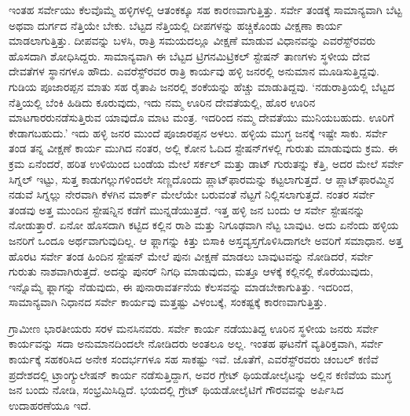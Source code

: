 ಇಂತಹ ಸರ್ವೇಯು ಕೆಲವೊಮ್ಮೆ ಹಳ್ಳಿಗಳಲ್ಲಿ ಆತಂಕಕ್ಕೂ ಸಹ ಕಾರಣವಾಗುತ್ತಿತ್ತು. ಸರ್ವೇ ತಂಡಕ್ಕೆ ಸಾಮಾನ್ಯವಾಗಿ ಬೆಟ್ಟ ಅಥವಾ ದುರ್ಗದ ನೆತ್ತಿಯೇ ಬೇಕು. ಬೆಟ್ಟದ ನೆತ್ತಿಯಲ್ಲಿ ದೀಪಗಳನ್ನು ಹಚ್ಚಿಕೊಂಡು ವೀಕ್ಷಣಾ ಕಾರ್ಯ ಮಾಡಲಾಗುತ್ತಿತ್ತು. ದೀಪವನ್ನು ಬಳಸಿ, ರಾತ್ರಿ ಸಮಯದಲ್ಲೂ ವೀಕ್ಷಣೆ ಮಾಡುವ ವಿಧಾನವನ್ನು ಎವರೆಸ್ಟ್​ರವರು ಹೊಸದಾಗಿ ಶೋಧಿಸಿದ್ದರು. ಸಾಮಾನ್ಯವಾಗಿ ಈ ಬೆಟ್ಟದ ಟ್ರಿಗನಮಿಟ್ರಿಕಲ್​ ಸ್ಟೇಷನ್​ ತಾಣಗಳು ಸ್ಥಳೀಯ ದೇವ ದೇವತೆಗಳ ಸ್ಥಾನಗಳೂ ಹೌದು. ಎವರೆಸ್ಟ್​ರವರ ರಾತ್ರಿ ಕಾರ್ಯವು ಹಳ್ಳಿ ಜನರಲ್ಲಿ ಅನುಮಾನ ಮೂಡಿಸುತ್ತಿದ್ದವು. ಗುಡಿಯ ಪೂಜಾರಪ್ಪನ ಮಾತು ಸಹ ರೈತಾಪಿ ಜನರಲ್ಲಿ ಶಂಕೆಯನ್ನು ಹೆಚ್ಚು ಮಾಡುತಿದ್ದವು. ‘ನಡುರಾತ್ರಿಯಲ್ಲಿ ಬೆಟ್ಟದ ನೆತ್ತಿಯಲ್ಲಿ ಬೆಂಕಿ ಹಿಡಿದು ಕೂರುವುದು, ಇದು ನಮ್ಮ ಊರಿನ ದೇವತೆಯಲ್ಲಿ, ಹೊರ ಊರಿನ ಮಾಟಗಾರರು\break ನಡೆಸುತ್ತಿರುವ ಯಾವುದೊ ಮಾಟ ಮಂತ್ರ. ಇದರಿಂದ ನಮ್ಮ ದೇವತೆಯು ಮುನಿಯಬಹುದು. ಊರಿಗೆ ಕೇಡಾಗಬಹುದು.’ ಇದು ಹಳ್ಳಿ ಜನರ ಮುಂದೆ ಪೂಜಾರಪ್ಪನ ಅಳಲು. ಹಳ್ಳಿಯ ಮುಗ್ಧ ಜನಕ್ಕೆ ಇಷ್ಟೇ ಸಾಕು. ಸರ್ವೇ ತಂಡ ತನ್ನ ವೀಕ್ಷಣೆ ಕಾರ್ಯ ಮುಗಿದ ನಂತರ, ಅಲ್ಲಿ ಕೋನ ಓದಿದ ಸ್ಟೇಷನ್​ಗಳಲ್ಲಿ ಗುರುತು ಮಾಡುವುದು ಕ್ರಮ. ಈ ಕ್ರಮ ಏನೆಂದರೆ, ಹರಿತ ಉಳಿಯಿಂದ ಬಂಡೆಯ ಮೇಲೆ ಸರ್ಕಲ್​ ಮತ್ತು ಡಾಟ್​ ಗುರುತನ್ನು ಕೆತ್ತಿ, ಅದರ ಮೇಲೆ ಸರ್ವೇ ಸಿಗ್ನಲ್​ ಇಟ್ಟು, ಸುತ್ತ ಕಾಡುಗಲ್ಲುಗಳಿಂದಲೇ ಸಣ್ಣದೊಂದು ಪ್ಲಾಟ್​ಫಾರಮನ್ನು ಕಟ್ಟಲಾಗುತ್ತದೆ. ಆ ಪ್ಲಾಟ್​ಫಾರಮ್ಮಿನ ನಡುವೆ ಸಿಗ್ನಲ್ಲು ನೇರವಾಗಿ ಕೆಳಗಿನ ಮಾರ್ಕ್ ಮೇಲೆಯೇ ಬರುವಂತೆ ನೆಟ್ಟಗೆ ನಿಲ್ಲಿಸಲಾಗುತ್ತದೆ. ನಂತರ ಸರ್ವೇ ತಂಡವು ಅತ್ತ ಮುಂದಿನ ಸ್ಟೇಷನ್ನಿನ ಕಡೆಗೆ ಮುನ್ನಡೆಯುತ್ತದೆ. ಇತ್ತ ಹಳ್ಳಿ ಜನ ಬಂದು ಆ ಸರ್ವೇ ಸ್ಟೇಷನನ್ನು ನೋಡುತ್ತಾರೆ. ಏನೋ ಹೊಸದಾಗಿ ಕಟ್ಟಿದ ಕಲ್ಲಿನ ರಾಶಿ ಮತ್ತು ನಿಗೂಢವಾಗಿ ನೆಟ್ಟ ಬಾವುಟ. ಅದು ಏನೆಂದು ಹಳ್ಳಿಯ ಜನರಿಗೆ ಒಂದೂ ಅರ್ಥವಾಗುವುದಿಲ್ಲ. ಆ ಫ್ಲಾಗನ್ನು ಕಿತ್ತು ಬಿಸಾಕಿ ಅಸ್ತವ್ಯಸ್ತಗೊಳಿಸಿದಾಗಲೇ ಅವರಿಗೆ ಸಮಾಧಾನ. ಅತ್ತ ಹೊರಟ ಸರ್ವೇ ತಂಡ ಹಿಂದಿನ ಸ್ಟೇಷನ್​ ಮೇಲೆ ಪುನಃ ವೀಕ್ಷಣೆ ಮಾಡಲು ಬಾವುಟವನ್ನು ನೋಡಿದರೆ, ಸರ್ವೇ ಗುರುತು ನಾಶವಾಗಿರುತ್ತದೆ. ಅದನ್ನು ಪುನರ್​ ನಿಗಧಿ ಮಾಡುವುದು, ಮತ್ತೂ ಆಳಕ್ಕೆ ಕಲ್ಲಿನಲ್ಲಿ ಕೊರೆಯುವುದು, ಇನ್ನೊಮ್ಮೆ ಫ್ಲಾಗನ್ನು ನೆಡುವುದು, ಈ ಪುನಾರಾವರ್ತನೆಯ ಕೆಲಸವನ್ನು ಮಾಡಬೇಕಾಗುತಿತ್ತು. ಇದರಿಂದ, ಸಾಮಾನ್ಯವಾಗಿ ನಿಧಾನದ ಸರ್ವೇ ಕಾರ್ಯವು ಮತ್ತಷ್ಟು ವಿಳಂಬಕ್ಕೆ, ಸಂಕಷ್ಟಕ್ಕೆ ಕಾರಣವಾಗುತ್ತಿತ್ತು.

ಗ್ರಾಮೀಣ ಭಾರತೀಯರು ಸರಳ ಮನಸಿನವರು. ಸರ್ವೇ ಕಾರ್ಯ ನಡೆಯುತಿದ್ದ ಊರಿನ ಸ್ಥಳೀಯ ಜನರು ಸರ್ವೇ ಕಾರ್ಯವನ್ನು ಸದಾ ಅನುಮಾನದಿಂದಲೇ ನೋಡಿದರು ಅಂತಲೂ ಅಲ್ಲ. ಇಂತಹ ಘಟನೆಗೆ ವ್ಯತಿರಿಕ್ತವಾಗಿ, ಸರ್ವೇ ಕಾರ್ಯಕ್ಕೆ ಸಹಕರಿಸಿದ ಅನೇಕ ಸಂದರ್ಭಗಳೂ ಸಹ ಸಾಕಷ್ಟು ಇವೆ. ಜೊತೆಗೆ, ಎವರೆಸ್ಟ್​ರವರು ಚಂಬಲ್​ ಕಣಿವೆ ಪ್ರದೇಶದಲ್ಲಿ ಟ್ರಾಂಗ್ಯುಲೇಷನ್​ ಕಾರ್ಯ ನಡೆಸುತ್ತಿದ್ದಾಗ, ಅವರ ಗ್ರೇಟ್​ ಥಿಯಡೋಲೈಟನ್ನು ಅಲ್ಲಿನ ಕಣಿವೆಯ ಮುಗ್ಧ ಜನ ಬಂದು ನೋಡಿ, ಸಂಭ್ರಮಿಸಿದ್ದಿದೆ. ಭಯದಲ್ಲಿ ಗ್ರೇಟ್​ ಥಿಯಡೋಲೈಟಿಗೆ ಗೌರವವನ್ನು ಅರ್ಪಿಸಿದ ಉದಾಹರಣೆಯೂ ಇದೆ.

